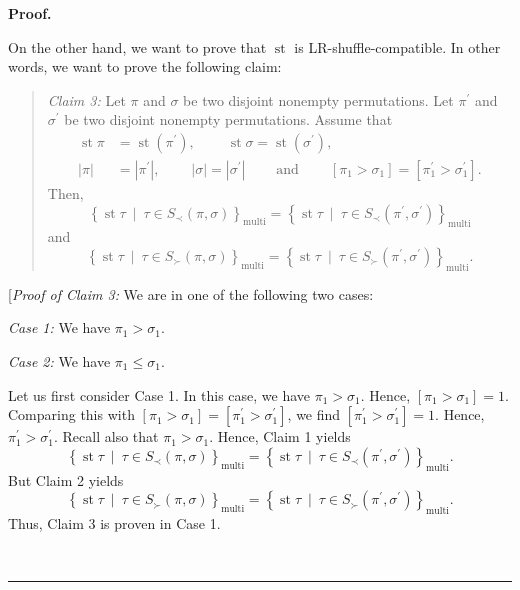 \documentclass[numbers=enddot,12pt,final,onecolumn,notitlepage]{scrartcl}%
\theoremstyle{definition}
\newenvironment{statement}{\begin{quote}}{\end{quote}}
\newenvironment{proof}[1][Proof]{\noindent\textbf{#1.} }{\ \rule{0.5em}{0.5em}}
\newenvironment{verlong}{}{}
\begin{document}
\begin{verlong}
\begin{proof}
\begin{statement}
\end{statement}

On the other hand, we want to prove that $\operatorname{st}$ is
LR-shuffle-compatible. In other words, we want to prove the following claim:

\begin{statement}
\textit{Claim 3:} Let $\pi$ and $\sigma$ be two disjoint nonempty
permutations. Let $\pi^{\prime}$ and $\sigma^{\prime}$ be two disjoint
nonempty permutations. Assume that%
\begin{align*}
\operatorname{st} \pi    &  =\operatorname{st}\left(
\pi^{\prime}\right)  ,\ \ \ \ \ \ \ \ \ \ \operatorname{st} \sigma
= \operatorname{st}\left(  \sigma^{\prime}\right)  ,\\
\left\vert \pi\right\vert  &  =\left\vert \pi^{\prime}\right\vert
,\ \ \ \ \ \ \ \ \ \ \left\vert \sigma\right\vert =\left\vert \sigma^{\prime
}\right\vert \ \ \ \ \ \ \ \ \ \ \text{and}\ \ \ \ \ \ \ \ \ \ \left[  \pi
_{1}>\sigma_{1}\right]  =\left[  \pi_{1}^{\prime}>\sigma_{1}^{\prime}\right]
.
\end{align*}
Then,
\[
\left\{  \operatorname{st} \tau   \ \mid\ \tau\in S_{\prec
}\left(  \pi,\sigma\right)  \right\}  _{\operatorname*{multi}}=\left\{
\operatorname{st} \tau   \ \mid\ \tau\in S_{\prec}\left(
\pi^{\prime},\sigma^{\prime}\right)  \right\}  _{\operatorname*{multi}}%
\]
and%
\[
\left\{  \operatorname{st} \tau   \ \mid\ \tau\in S_{\succ
}\left(  \pi,\sigma\right)  \right\}  _{\operatorname*{multi}}=\left\{
\operatorname{st} \tau   \ \mid\ \tau\in S_{\succ}\left(
\pi^{\prime},\sigma^{\prime}\right)  \right\}  _{\operatorname*{multi}}.
\]

\end{statement}

[\textit{Proof of Claim 3:} We are in one of the following two cases:

\textit{Case 1:} We have $\pi_{1}>\sigma_{1}$.

\textit{Case 2:} We have $\pi_{1}\leq\sigma_{1}$.

Let us first consider Case 1. In this case, we have $\pi_{1}>\sigma_{1}$.
Hence, $\left[  \pi_{1}>\sigma_{1}\right]  =1$. Comparing this with $\left[
\pi_{1}>\sigma_{1}\right]  =\left[  \pi_{1}^{\prime}>\sigma_{1}^{\prime
}\right]  $, we find $\left[  \pi_{1}^{\prime}>\sigma_{1}^{\prime}\right]
=1$. Hence, $\pi_{1}^{\prime}>\sigma_{1}^{\prime}$. Recall also that $\pi
_{1}>\sigma_{1}$. Hence, Claim 1 yields%
\[
\left\{  \operatorname{st} \tau   \ \mid\ \tau\in S_{\prec
}\left(  \pi,\sigma\right)  \right\}  _{\operatorname*{multi}}=\left\{
\operatorname{st} \tau   \ \mid\ \tau\in S_{\prec}\left(
\pi^{\prime},\sigma^{\prime}\right)  \right\}  _{\operatorname*{multi}}.
\]
But Claim 2 yields%
\[
\left\{  \operatorname{st} \tau   \ \mid\ \tau\in S_{\succ
}\left(  \pi,\sigma\right)  \right\}  _{\operatorname*{multi}}=\left\{
\operatorname{st} \tau   \ \mid\ \tau\in S_{\succ}\left(
\pi^{\prime},\sigma^{\prime}\right)  \right\}  _{\operatorname*{multi}}.
\]
Thus, Claim 3 is proven in Case 1.


\end{proof}
\end{verlong}
\end{document}
